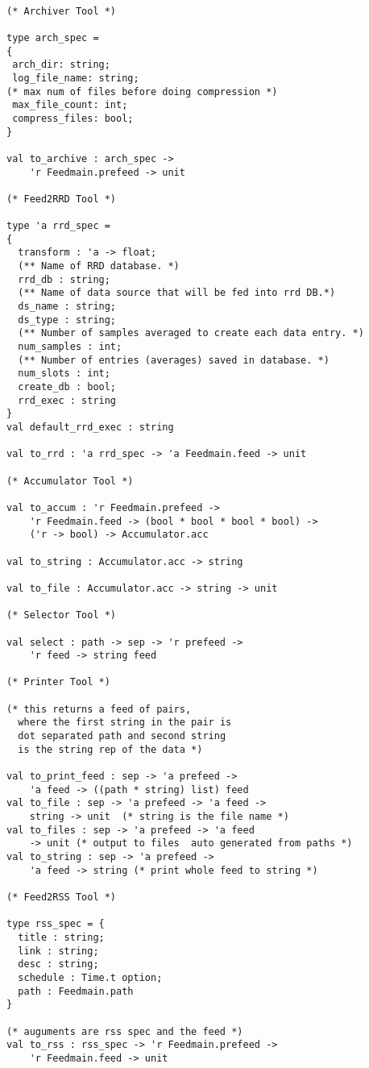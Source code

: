 \begin{verbatim}

(* Archiver Tool *)

type arch_spec =
{
 arch_dir: string;
 log_file_name: string;
(* max num of files before doing compression *)
 max_file_count: int; 
 compress_files: bool;
}

val to_archive : arch_spec -> 
	'r Feedmain.prefeed -> unit

(* Feed2RRD Tool *)

type 'a rrd_spec =
{
  transform : 'a -> float;
  (** Name of RRD database. *)
  rrd_db : string;
  (** Name of data source that will be fed into rrd DB.*)
  ds_name : string;
  ds_type : string;
  (** Number of samples averaged to create each data entry. *)
  num_samples : int;
  (** Number of entries (averages) saved in database. *)
  num_slots : int;
  create_db : bool;
  rrd_exec : string
}
val default_rrd_exec : string

val to_rrd : 'a rrd_spec -> 'a Feedmain.feed -> unit

(* Accumulator Tool *)

val to_accum : 'r Feedmain.prefeed -> 
	'r Feedmain.feed -> (bool * bool * bool * bool) -> 
	('r -> bool) -> Accumulator.acc

val to_string : Accumulator.acc -> string

val to_file : Accumulator.acc -> string -> unit

(* Selector Tool *)

val select : path -> sep -> 'r prefeed -> 
	'r feed -> string feed

(* Printer Tool *)

(* this returns a feed of pairs, 
  where the first string in the pair is 
  dot separated path and second string 
  is the string rep of the data *)

val to_print_feed : sep -> 'a prefeed -> 
	'a feed -> ((path * string) list) feed
val to_file : sep -> 'a prefeed -> 'a feed -> 
	string -> unit  (* string is the file name *)
val to_files : sep -> 'a prefeed -> 'a feed 
	-> unit (* output to files  auto generated from paths *)
val to_string : sep -> 'a prefeed -> 
	'a feed -> string (* print whole feed to string *)

(* Feed2RSS Tool *)

type rss_spec = {
  title : string;
  link : string;
  desc : string;
  schedule : Time.t option;
  path : Feedmain.path
}

(* auguments are rss spec and the feed *)
val to_rss : rss_spec -> 'r Feedmain.prefeed -> 
	'r Feedmain.feed -> unit

\end{verbatim}
